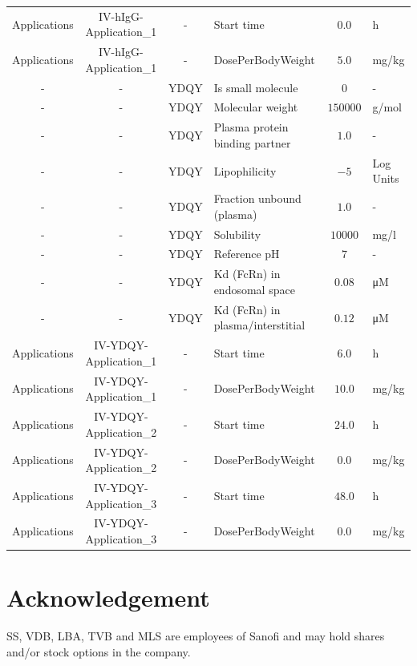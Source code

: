 \documentclass[fleqn,10pt]{physiome}
\begin{document}
\begin{landscape}
\begin{table}[htbp]
\begin{threeparttable}
\begin{tabular}{ccclcl}
            Applications & IV-hIgG-Application\_1 & - & Start time & $0.0$ & h \\
            Applications & IV-hIgG-Application\_1 & - & DosePerBodyWeight & $5.0$ & mg/kg \\
            - & - & YDQY & Is small molecule & $0$ & -\\
            - & - & YDQY & Molecular weight & $150000$ & g/mol\\
            - & - & YDQY & Plasma protein binding partner & $1.0$ & -\\
            - & - & YDQY & Lipophilicity & $-5$ & Log Units \\
            - & - & YDQY & Fraction unbound (plasma) & $1.0$ & -\\
            - & - & YDQY & Solubility & $10000$ & mg/l\\
            - & - & YDQY & Reference pH & $7$ & -\\
            - & - & YDQY & Kd (FcRn) in endosomal space & $0.08$ & \si{\micro M}\\
            - & - & YDQY & Kd (FcRn) in plasma/interstitial & $0.12$ & \si{\micro M}\\
            Applications & IV-YDQY-Application\_1 & - & Start time & $6.0$ & h \\
            Applications & IV-YDQY-Application\_1 & - & DosePerBodyWeight & $10.0$ & mg/kg \\
            Applications & IV-YDQY-Application\_2 & - & Start time & $24.0$ & h \\
            Applications & IV-YDQY-Application\_2 & - & DosePerBodyWeight & $0.0$ & mg/kg \\
            Applications & IV-YDQY-Application\_3 & - & Start time & $48.0$ & h \\
            Applications & IV-YDQY-Application\_3 & - & DosePerBodyWeight & $0.0$ & mg/kg \\
            \bottomrule
        \end{tabular}
    \end{threeparttable}
\end{table}
\end{landscape}

\section{Acknowledgement}

SS, VDB, LBA, TVB and MLS are employees of Sanofi and may hold shares and/or stock options in the company.


\end{document}
